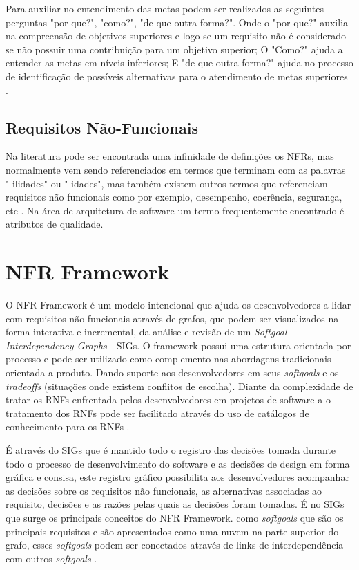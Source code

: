 Para auxiliar no entendimento das metas podem ser realizados as seguintes perguntas "por que?", "como?", "de que outra forma?"\cite{van2001goal}. Onde o "por que?" auxilia na compreensão de objetivos superiores e logo se um requisito não é considerado se não possuir uma contribuição para um objetivo superior; O "Como?" ajuda a entender as metas em níveis inferiores\cite{yu1998goal}; E "de que outra forma?" ajuda no processo de identificação de possíveis alternativas para o atendimento de metas superiores \cite{van2001goal}.  

\subsection{Requisitos Não-Funcionais}

Na literatura pode ser encontrada uma infinidade de definições os NFRs, mas normalmente vem sendo referenciados em termos que terminam com as palavras "-ilidades" ou "-idades", mas também existem outros termos que referenciam requisitos não funcionais como por exemplo, desempenho, coerência, segurança, etc \cite{chung2012non}. Na área de arquitetura de software um termo frequentemente encontrado é atributos de qualidade\cite{barbacci1995quality}.

\section{NFR Framework}

O NFR Framework é um modelo intencional que ajuda os desenvolvedores  a  lidar com requisitos não-funcionais através de grafos, que podem ser visualizados na forma interativa e incremental, da análise e revisão de um \textit{Softgoal Interdependency Graphs} - SIGs. O framework possui uma estrutura orientada por processo e pode ser utilizado como complemento nas abordagens tradicionais orientada a produto. Dando suporte aos desenvolvedores em seus \textit{softgoals} e os \textit{tradeoffs} (situações onde existem conflitos de escolha). Diante da complexidade de tratar os RNFs enfrentada pelos desenvolvedores em projetos de software a o tratamento dos RNFs	pode ser facilitado através do uso de catálogos de conhecimento para os RNFs \cite{chung2012non}. 


É através do SIGs que é mantido todo o registro das decisões tomada durante todo o processo de desenvolvimento do software e as decisões de design em forma gráfica e consisa, este registro gráfico possibilita aos desenvolvedores acompanhar as decisões sobre os requisitos não funcionais, as alternativas associadas  ao requisito, decisões e as razões pelas quais as decisões foram tomadas. É no SIGs que surge os principais conceitos do NFR Framework. como \textit{softgoals} que são os principais requisitos e são apresentados como uma nuvem na parte superior do grafo, esses \textit{softgoals} podem ser conectados através de links de interdependência com outros \textit{softgoals} \cite{chung2012non}.

